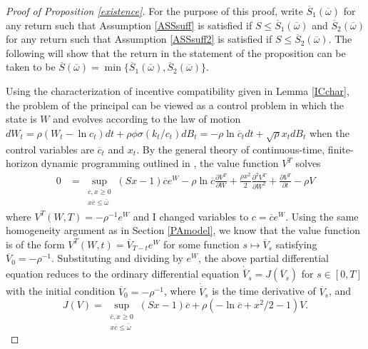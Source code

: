 \documentclass[11pt]{article}
\theoremstyle{plain}
\theoremstyle{definition} %
\begin{document}
\begin{proof}[Proof of Proposition \ref{existence}]
For the purpose of this proof, write $\overline{S}_1(\overline{\omega})$ for any return such that Assumption \ref{ASSsuff} is satisfied if $S \leq \overline{S}_1(\overline{\omega})$ and $\overline{S}_2(\overline{\omega})$ for any return such that Assumption \ref{ASSsuff2} is satisfied if $S \leq \overline{S}_2(\overline{\omega})$. The following will show that the return in the statement of the proposition can be taken to be $\overline{S}(\overline{\omega}) = \min\{\overline{S}_1(\overline{\omega}), \overline{S}_2(\overline{\omega})\}$. 

Using the characterization of incentive compatibility given in Lemma \ref{ICchar}, the problem of the principal can be viewed as a control problem in which the state is $W$ and evolves according to the law of motion $dW_t = \rho(W_t - \ln c_t)dt + \rho \phi \sigma (k_t/c_t)dB_t = - \rho \ln \overline{c}_tdt + \sqrt{\rho} x_tdB_t$ when the control variables are $\overline{c}_t$ and $x_t$. By the general theory of continuous-time, finite-horizon dynamic programming outlined in \cite{kushner_numerical_2001}, the value function $V^T$ solves %
\begin{align*}
0 & = \sup_{\substack{\overline{c},x\geq 0 \\ x\overline{c} \leq \overline{\omega}}} (Sx - 1)\overline{c}e^W - \rho\ln \overline{c} \frac{\partial V^T}{\partial W} + \frac{\rho x^2}{2}\frac{\partial^2V^T}{\partial W^2} + \frac{\partial V^T}{\partial t} - \rho V
\end{align*} 
where $V^T(W,T) = -\rho^{-1}e^W$ and I changed variables to $c = \overline{c}e^W$. Using the same homogeneity argument as in Section \ref{PAmodel}, we know that the value function is of the form $V^T(W,t) = \overline{V}_{T-t}e^{W}$ for some function $s \mapsto \overline{V}_s$ satisfying $\overline{V}_0 = -\rho^{-1}$. Substituting and dividing by $e^W$, the above partial differential equation reduces to the ordinary differential equation $\dot{\overline{V}}_s = J(\overline{V}_s)$ for $s \in [0,T]$ with the initial condition $\overline{V}_0 = -\rho^{-1}$, where $\dot{\overline{V}}_s$ is the time derivative of $\overline{V}_s$, and
\begin{equation}
J(V) = \sup_{\substack{\overline{c}, x\geq 0 \\ x\overline{c} \leq \overline{\omega}}} (Sx - 1)\overline{c} + \rho( -\ln \overline{c} + x^2/2 - 1)V.
\label{Jdef}
\end{equation} 

\end{proof}
\end{document}
